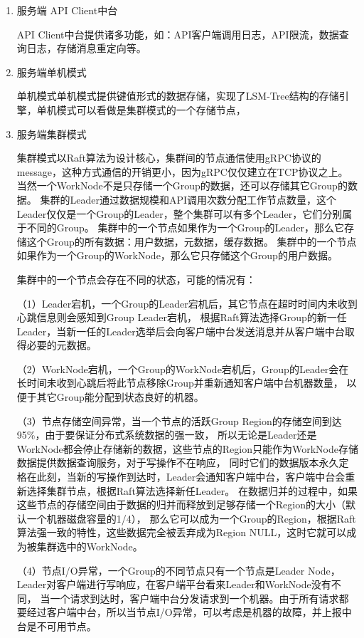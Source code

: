 		\begin{enumerate}[fullwidth,itemindent=2em,listparindent=2em]
			\item 服务端 API Client中台
			
			API Client中台提供诸多功能，如：API客户端调用日志，API限流，数据查询日志，存储消息重定向等。

			\item 服务端单机模式
			
			单机模式单机模式提供键值形式的数据存储，实现了LSM-Tree结构的存储引擎，单机模式可以看做是集群模式的一个存储节点，
			
			\item 服务端集群模式
			
			集群模式以Raft算法为设计核心，集群间的节点通信使用gRPC协议的message，这种方式通信的开销更小，因为gRPC仅仅建立在TCP协议之上。
			当然一个WorkNode不是只存储一个Group的数据，还可以存储其它Group的数据。
			集群的Leader通过数据规模和API调用次数分配工作节点数量，这个Leader仅仅是一个Group的Leader，整个集群可以有多个Leader，它们分别属于不同的Group。
			集群中的一个节点如果作为一个Group的Leader，那么它存储这个Group的所有数据：用户数据，元数据，缓存数据。
			集群中的一个节点如果作为一个Group的WorkNode，那么它只存储这个Group的用户数据。
			
			集群中的一个节点会存在不同的状态，可能的情况有：
	
			（1）Leader宕机，一个Group的Leader宕机后，其它节点在超时时间内未收到心跳信息则会感知到Group Leader宕机，
			根据Raft算法选择Group的新一任Leader，当新一任的Leader选举后会向客户端中台发送消息并从客户端中台取得必要的元数据。
			
			（2）WorkNode宕机，一个Group的WorkNode宕机后，Group的Leader会在长时间未收到心跳后将此节点移除Group并重新通知客户端中台机器数量，
			以便于其它Group能分配到状态良好的机器。
			
			（3）节点存储空间异常，当一个节点的活跃Group Region的存储空间到达95\%，由于要保证分布式系统数据的强一致，
			所以无论是Leader还是WorkNode都会停止存储新的数据，这些节点的Region只能作为WorkNode存储数据提供数据查询服务，对于写操作不在响应，
			同时它们的数据版本永久定格在此刻，当新的写操作到达时，Leader会通知客户端中台，客户端中台会重新选择集群节点，根据Raft算法选择新任Leader。
			在数据归并的过程中，如果这些节点的存储空间由于数据的归并而释放到足够存储一个Region的大小（默认一个机器磁盘容量的1/4），
			那么它可以成为一个Group的Region，根据Raft算法强一致的特性，这些数据完全被丢弃成为Region NULL，这时它就可以成为被集群选中的WorkNode。
	
			（4）节点I/O异常，一个Group的不同节点只有一个节点是Leader Node，Leader对客户端进行写响应，在客户端平台看来Leader和WorkNode没有不同，
			当一个请求到达时，客户端中台分发请求到一个机器。由于所有请求都要经过客户端中台，所以当节点I/O异常，可以考虑是机器的故障，并上报中台是不可用节点。
	

\end{enumerate}
